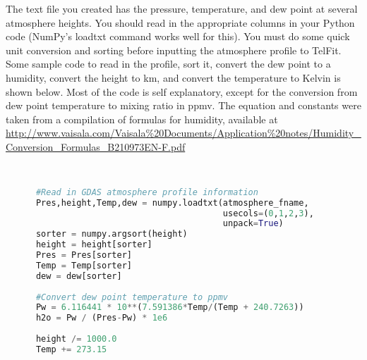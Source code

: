 \documentclass{article}
\begin{document}
The text file you created has the pressure, temperature, and dew point at several atmosphere heights. You should read in the appropriate columns in your Python code (NumPy's loadtxt command works well for this). You must do some quick unit conversion and sorting before inputting the atmosphere profile to TelFit. Some sample code to read in the profile, sort it, convert the dew point to a humidity, convert the height to km, and convert the temperature to Kelvin is shown below. Most of the code is self explanatory, except for the conversion from dew point temperature to mixing ratio in ppmv. The equation and constants were taken from a compilation of formulas for humidity, available at \url{http://www.vaisala.com/Vaisala%20Documents/Application%20notes/Humidity_Conversion_Formulas_B210973EN-F.pdf}





\begin{lstlisting}[language=Python, caption={Code to adjust units from GDAS archive}]


      #Read in GDAS atmosphere profile information
      Pres,height,Temp,dew = numpy.loadtxt(atmosphere_fname,
                                           usecols=(0,1,2,3), 
                                           unpack=True)
      sorter = numpy.argsort(height)
      height = height[sorter]
      Pres = Pres[sorter]
      Temp = Temp[sorter]
      dew = dew[sorter]
      
      #Convert dew point temperature to ppmv
      Pw = 6.116441 * 10**(7.591386*Temp/(Temp + 240.7263))
      h2o = Pw / (Pres-Pw) * 1e6
      
      height /= 1000.0
      Temp += 273.15


\end{lstlisting}


%
\end{document}
